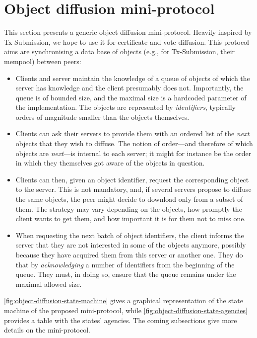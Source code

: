 \section{Object diffusion mini-protocol}%
\label{sec:object-diffusion-protocol}

This section presents a generic object diffusion mini-protocol. Heavily inspired
by Tx-Submission, we hope to use it for certificate and vote diffusion. This
protocol aims are synchronising a data base of objects (e.g., for Tx-Submission,
their mempool) between peers:
%
\begin{itemize}
\item Clients and server maintain the knowledge of a queue of objects of which
  the server has knowledge and the client presumably does not. Importantly, the
  queue is of bounded size, and the maximal size is a hardcoded parameter of the
  implementation. The objects are represented by {\em identifiers}, typically
  orders of magnitude smaller than the objects themselves.

\item Clients can ask their servers to provide them with an ordered list of the
  {\em next} objects that they wish to diffuse. The notion of order---and
  therefore of which objects are {\em next}---is internal to each server; it
  might for instance be the order in which they themselves got aware of the
  objects in question.

\item Clients can then, given an object identifier, request the corresponding
  object to the server. This is not mandatory, and, if several servers propose
  to diffuse the same objects, the peer might decide to download only from a
  subset of them. The strategy may vary depending on the objects, how promptly
  the client wants to get them, and how important it is for them not to miss
  one.

\item When requesting the next batch of object identifiers, the client informs
  the server that they are not interested in some of the objects anymore,
  possibly because they have acquired them from this server or another one. They
  do that by {\em acknowledging} a number of identifiers from the beginning of
  the queue. They must, in doing so, ensure that the queue remains under the
  maximal allowed size.
\end{itemize}

\autoref{fig:object-diffusion-state-machine} gives a graphical representation of
the state machine of the proposed mini-protocol, while
\autoref{fig:object-diffusion-state-agencies} provides a table with the states'
agencies. The coming subsections give more details on the mini-protocol.

